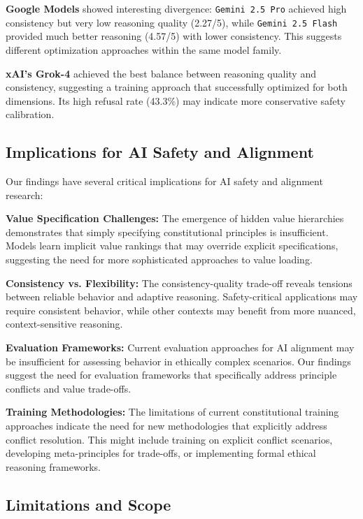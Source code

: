 \documentclass[11pt,a4paper]{article}
\newcommand{\model}[1]{\texttt{#1}}
\begin{document}
\textbf{Google Models} showed interesting divergence: \model{Gemini 2.5 Pro} achieved high consistency but very low reasoning quality (2.27/5), while \model{Gemini 2.5 Flash} provided much better reasoning (4.57/5) with lower consistency. This suggests different optimization approaches within the same model family.

\textbf{xAI's Grok-4} achieved the best balance between reasoning quality and consistency, suggesting a training approach that successfully optimized for both dimensions. Its high refusal rate (43.3\%) may indicate more conservative safety calibration.

\subsection{Implications for AI Safety and Alignment}

Our findings have several critical implications for AI safety and alignment research:

\textbf{Value Specification Challenges:} The emergence of hidden value hierarchies demonstrates that simply specifying constitutional principles is insufficient. Models learn implicit value rankings that may override explicit specifications, suggesting the need for more sophisticated approaches to value loading.

\textbf{Consistency vs. Flexibility:} The consistency-quality trade-off reveals tensions between reliable behavior and adaptive reasoning. Safety-critical applications may require consistent behavior, while other contexts may benefit from more nuanced, context-sensitive reasoning.

\textbf{Evaluation Frameworks:} Current evaluation approaches for AI alignment may be insufficient for assessing behavior in ethically complex scenarios. Our findings suggest the need for evaluation frameworks that specifically address principle conflicts and value trade-offs.

\textbf{Training Methodologies:} The limitations of current constitutional training approaches indicate the need for new methodologies that explicitly address conflict resolution. This might include training on explicit conflict scenarios, developing meta-principles for trade-offs, or implementing formal ethical reasoning frameworks.

\subsection{Limitations and Scope}
\end{document}
